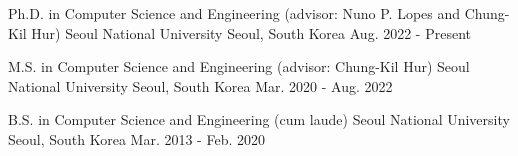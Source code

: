 

\begin{cventries}

  \cvedu
  {Ph.D. in Computer Science and Engineering (advisor: Nuno P. Lopes and Chung-Kil Hur)} %
  {Seoul National University} %
  {Seoul, South Korea} %
  {Aug. 2022 - Present} %

  \cvedu
  {M.S. in Computer Science and Engineering (advisor: Chung-Kil Hur)} %
  {Seoul National University} %
  {Seoul, South Korea} %
  {Mar. 2020 - Aug. 2022} %

  \cvedu
  {B.S. in Computer Science and Engineering (cum laude)} %
  {Seoul National University} %
  {Seoul, South Korea} %
  {Mar. 2013 - Feb. 2020} %

\end{cventries}
